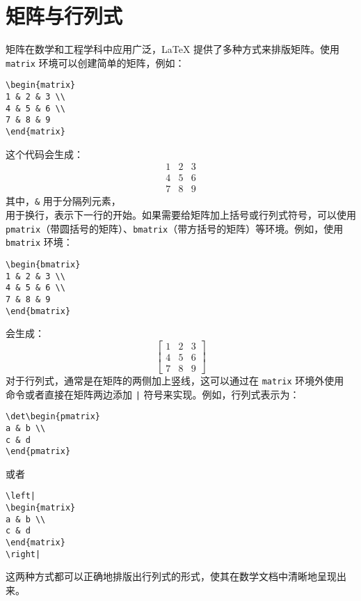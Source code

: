 \documentclass{article}
\begin{document}
\section{矩阵与行列式}
矩阵在数学和工程学科中应用广泛，LaTeX 提供了多种方式来排版矩阵。使用 \texttt{matrix} 环境可以创建简单的矩阵，例如：
\begin{verbatim}
\begin{matrix}
1 & 2 & 3 \\
4 & 5 & 6 \\
7 & 8 & 9
\end{matrix}
\end{verbatim}
这个代码会生成：
\[
\begin{matrix}
1 & 2 & 3 \\
4 & 5 & 6 \\
7 & 8 & 9
\end{matrix}
\]
其中，\texttt{\&} 用于分隔列元素，\texttt{\\} 用于换行，表示下一行的开始。如果需要给矩阵加上括号或行列式符号，可以使用 \texttt{pmatrix}（带圆括号的矩阵）、\texttt{bmatrix}（带方括号的矩阵）等环境。例如，使用 \texttt{bmatrix} 环境：
\begin{verbatim}
\begin{bmatrix}
1 & 2 & 3 \\
4 & 5 & 6 \\
7 & 8 & 9
\end{bmatrix}
\end{verbatim}
会生成：
\[
\begin{bmatrix}
1 & 2 & 3 \\
4 & 5 & 6 \\
7 & 8 & 9
\end{bmatrix}
\]
对于行列式，通常是在矩阵的两侧加上竖线，这可以通过在 \texttt{matrix} 环境外使用 \texttt{\det} 命令或者直接在矩阵两边添加 \texttt{|} 符号来实现。例如，行列式表示为：
\begin{verbatim}
\det\begin{pmatrix}
a & b \\
c & d
\end{pmatrix}
\end{verbatim}
或者
\begin{verbatim}
\left|
\begin{matrix}
a & b \\
c & d
\end{matrix}
\right|
\end{verbatim}
这两种方式都可以正确地排版出行列式的形式，使其在数学文档中清晰地呈现出来。
\end{document}
